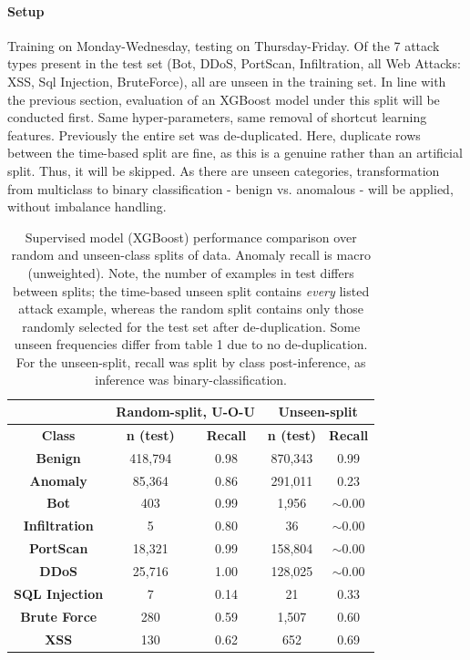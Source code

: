 \documentclass{article}
\begin{document}
\paragraph{Setup} Training on Monday-Wednesday, testing on Thursday-Friday. Of the 7 attack types present in the test set (Bot, DDoS, PortScan, Infiltration, all Web Attacks: XSS, Sql Injection, BruteForce), all are unseen in the training set. In line with the previous section, evaluation of an XGBoost model under this split will be conducted first. Same hyper-parameters, same removal of shortcut learning features. Previously the entire set was de-duplicated. Here, duplicate rows between the time-based split are fine, as this is a genuine rather than an artificial split. Thus, it will be skipped. As there are unseen categories, transformation from multiclass to binary classification - benign vs. anomalous - will be applied, without imbalance handling.

\begin{table}[H]
    \centering
    \begin{tabular}{c | c|c | c|c}
         & \multicolumn{2}{c|}{\textbf{Random-split, U-O-U}} & \multicolumn{2}{c}{\textbf{Unseen-split}} \\
        \midrule
         \textbf{Class} & \textbf{n (test)} & \textbf{Recall} & \textbf{n (test)} & \textbf{Recall} \\
        \midrule
        \textbf{Benign} & 418,794 & 0.98 & 870,343 & 0.99 \\
        \textbf{Anomaly} & 85,364 & 0.86 & 291,011 & 0.23 \\
        \textbf{Bot} & 403 & 0.99 & 1,956 & $\sim$0.00 \\
        \textbf{Infiltration} & 5 & 0.80 & 36 & $\sim$0.00 \\
        \textbf{PortScan} & 18,321 & 0.99 & 158,804 & $\sim$0.00 \\
        \textbf{DDoS} & 25,716 & 1.00 & 128,025 & $\sim$0.00 \\
        \textbf{SQL Injection} & 7 & 0.14 & 21 & 0.33 \\
        \textbf{Brute Force}& 280 & 0.59 & 1,507 & 0.60 \\
        \textbf{XSS} & 130 & 0.62 & 652 & 0.69 \\
        \bottomrule
    \end{tabular}

\caption{Supervised model (XGBoost) performance comparison over random and unseen-class splits of data. Anomaly recall is macro (unweighted). Note, the number of examples in test differs between splits; the time-based unseen split contains \textit{every} listed attack example, whereas the random split contains only those randomly selected for the test set after de-duplication. Some unseen frequencies differ from table 1 due to no de-duplication. For the unseen-split, recall was split by class post-inference, as inference was binary-classification.}
\end{table}
\end{document}
